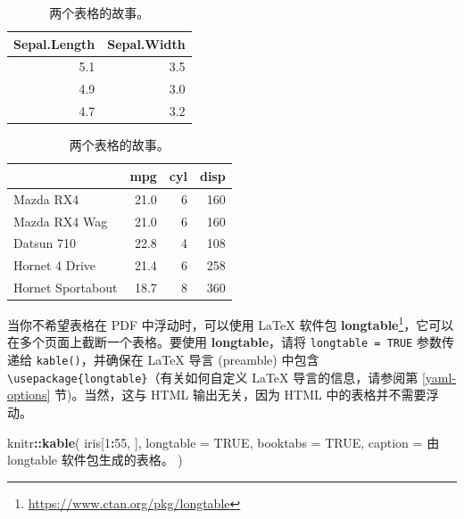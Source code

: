\documentclass[
  12pt,
]{krantz}
\newenvironment{Shaded}{\begin{snugshade}}{\end{snugshade}}
\newcommand{\AttributeTok}[1]{\textcolor[rgb]{0.13,0.29,0.53}{#1}}
\newcommand{\ConstantTok}[1]{\textcolor[rgb]{0.56,0.35,0.01}{#1}}
\newcommand{\DecValTok}[1]{\textcolor[rgb]{0.00,0.00,0.81}{#1}}
\newcommand{\FunctionTok}[1]{\textcolor[rgb]{0.13,0.29,0.53}{\textbf{#1}}}
\newcommand{\NormalTok}[1]{#1}
\newcommand{\SpecialCharTok}[1]{\textcolor[rgb]{0.81,0.36,0.00}{\textbf{#1}}}
\newcommand{\StringTok}[1]{\textcolor[rgb]{0.31,0.60,0.02}{#1}}
\renewcommand{\href}[2]{#2\footnote{\url{#1}}}
\theoremstyle{definition}
\theoremstyle{definition}
\theoremstyle{definition}
\theoremstyle{definition}
\theoremstyle{remark}
\begin{document}
\begin{table}
\caption{\label{tab:table-multi}两个表格的故事。}

\centering
\begin{tabular}[t]{rr}
\toprule
Sepal.Length & Sepal.Width\\
\midrule
5.1 & 3.5\\
4.9 & 3.0\\
4.7 & 3.2\\
\bottomrule
\end{tabular}
\centering
\begin{tabular}[t]{lrrr}
\toprule
  & mpg & cyl & disp\\
\midrule
Mazda RX4 & 21.0 & 6 & 160\\
Mazda RX4 Wag & 21.0 & 6 & 160\\
Datsun 710 & 22.8 & 4 & 108\\
Hornet 4 Drive & 21.4 & 6 & 258\\
Hornet Sportabout & 18.7 & 8 & 360\\
\bottomrule
\end{tabular}
\end{table}

当你不希望表格在 PDF 中浮动时，可以使用 LaTeX 软件包 \href{https://www.ctan.org/pkg/longtable}{\textbf{longtable}}，它可以在多个页面上截断一个表格。要使用 \textbf{longtable}，请将 \texttt{longtable\ =\ TRUE} 参数传递给 \texttt{kable()}，并确保在 LaTeX 导言 (preamble) 中包含 \texttt{\textbackslash{}usepackage\{longtable\}}（有关如何自定义 LaTeX 导言的信息，请参阅第 \ref{yaml-options} 节)。当然，这与 HTML 输出无关，因为 HTML 中的表格并不需要浮动。

\begin{Shaded}
\begin{Highlighting}[]
\NormalTok{knitr}\SpecialCharTok{::}\FunctionTok{kable}\NormalTok{(}
\NormalTok{  iris[}\DecValTok{1}\SpecialCharTok{:}\DecValTok{55}\NormalTok{, ], }\AttributeTok{longtable =} \ConstantTok{TRUE}\NormalTok{, }\AttributeTok{booktabs =} \ConstantTok{TRUE}\NormalTok{,}
  \AttributeTok{caption =} \StringTok{\textquotesingle{}由 longtable 软件包生成的表格。\textquotesingle{}}
\NormalTok{)}
\end{Highlighting}
\end{Shaded}
\end{document}
